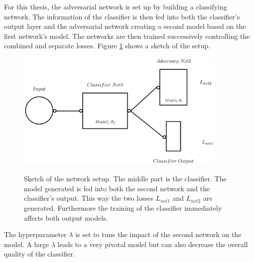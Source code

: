 For this thesis, the adversarial network is set up by building a classifying network. The information of the classifier is then fed into both the classifier's output layer and the adversarial network creating a second model based on the first network's model. The networks are then trained successively controlling the combined and separate losses. Figure \ref{fig:ANN_sketch} shows a sketch of the setup.
%
\begin{figure}[htbp]
	\centering
	\includegraphics[width=0.9\textwidth]{figures_ML/ANN_sketch.png}
	\label{fig:ANN_sketch}
	\caption[Adversarial setup sketched]{Sketch of the network setup. The middle part is the classifier. The model generated is fed into both the second network and the classifier's output. This way the two losses $L_{net1}$ and $L_{net2}$ are generated. Furthermore the training of the classifier immediately affects both output models.}
\end{figure}
%
The hyperparameter $\lambda$ is set to tune the impact of the second network on the model. A large $\lambda$ leads to a very pivotal model but can also decrease the overall quality of the classifier.

